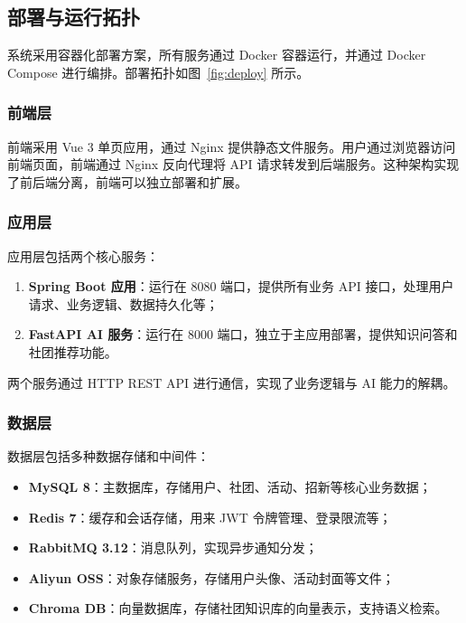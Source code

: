 \subsection{部署与运行拓扑}

系统采用容器化部署方案，所有服务通过 Docker 容器运行，并通过 Docker Compose 进行编排。部署拓扑如图~\ref{fig:deploy} 所示。

\subsubsection{前端层}

前端采用 Vue 3 单页应用，通过 Nginx 提供静态文件服务。用户通过浏览器访问前端页面，前端通过 Nginx 反向代理将 API 请求转发到后端服务。这种架构实现了前后端分离，前端可以独立部署和扩展。

\subsubsection{应用层}

应用层包括两个核心服务：

\begin{enumerate}
  \item \textbf{Spring Boot 应用}：运行在 8080 端口，提供所有业务 API 接口，处理用户请求、业务逻辑、数据持久化等；
  \item \textbf{FastAPI AI 服务}：运行在 8000 端口，独立于主应用部署，提供知识问答和社团推荐功能。
\end{enumerate}

两个服务通过 HTTP REST API 进行通信，实现了业务逻辑与 AI 能力的解耦。

\subsubsection{数据层}

数据层包括多种数据存储和中间件：

\begin{itemize}
  \item \textbf{MySQL 8}：主数据库，存储用户、社团、活动、招新等核心业务数据；
  \item \textbf{Redis 7}：缓存和会话存储，用来 JWT 令牌管理、登录限流等；
  \item \textbf{RabbitMQ 3.12}：消息队列，实现异步通知分发；
  \item \textbf{Aliyun OSS}：对象存储服务，存储用户头像、活动封面等文件；
  \item \textbf{Chroma DB}：向量数据库，存储社团知识库的向量表示，支持语义检索。
\end{itemize}

